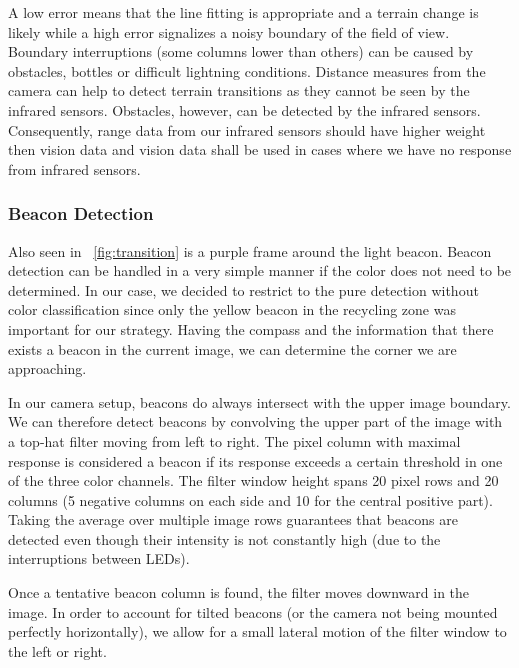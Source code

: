 A low error means that the line fitting is appropriate and a terrain change is likely
while a high error signalizes a noisy boundary of the field of view. Boundary interruptions
(some columns lower than others) can be caused by obstacles, bottles or difficult lightning
conditions. Distance measures from the camera can help to detect 
terrain transitions as they cannot be seen by the infrared sensors. Obstacles,
however, can be detected by the infrared sensors. Consequently, range data from 
our infrared sensors should have higher weight then vision data and vision data
shall be used in cases where we have no response from infrared sensors.

\subsubsection{Beacon Detection}
Also seen in \figurename~\ref{fig:transition} is a purple frame around the light beacon.
Beacon detection can be handled in a very simple manner if the color does not need
to be determined. In our case, we decided to restrict to the pure detection without 
color classification since only the yellow beacon in the recycling zone was important
for our strategy. Having the compass and the information that there exists a beacon
in the current image, we can determine the corner we are approaching.

In our camera setup, beacons do always intersect with the upper image boundary.
We can therefore detect beacons by convolving the upper part of the image with a top-hat filter
moving from left to right. The pixel column with maximal response is considered a beacon
if its response exceeds a certain threshold in one of the three color channels. The filter
window height spans 20 pixel rows and 20 columns (5 negative columns on each side and 10 for
the central positive part). Taking the average over multiple image rows guarantees
that beacons are detected even though their intensity is not constantly high (due 
to the interruptions between LEDs). 

Once a tentative beacon column is found, the filter moves downward in the image.
In order to account for tilted beacons (or the camera not being mounted perfectly
horizontally), we allow for a small lateral motion of the filter window to the left
or right.

